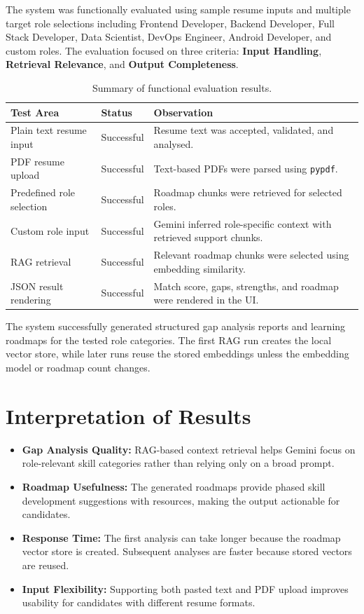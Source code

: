 \documentclass[12pt,a4paper]{report}
\begin{document}
The system was functionally evaluated using sample resume inputs and multiple
target role selections including Frontend Developer, Backend Developer, Full
Stack Developer, Data Scientist, DevOps Engineer, Android Developer, and custom
roles. The evaluation focused on three criteria: \textbf{Input Handling},
\textbf{Retrieval Relevance}, and \textbf{Output Completeness}.

\begin{table}[H]
\centering
\caption{Summary of functional evaluation results.}
\begin{tabular}{|p{4cm}|p{3cm}|p{6cm}|}
\hline
\textbf{Test Area} & \textbf{Status} & \textbf{Observation} \\
\hline
Plain text resume input & Successful & Resume text was accepted, validated, and analysed. \\
\hline
PDF resume upload & Successful & Text-based PDFs were parsed using \texttt{pypdf}. \\
\hline
Predefined role selection & Successful & Roadmap chunks were retrieved for selected roles. \\
\hline
Custom role input & Successful & Gemini inferred role-specific context with retrieved support chunks. \\
\hline
RAG retrieval & Successful & Relevant roadmap chunks were selected using embedding similarity. \\
\hline
JSON result rendering & Successful & Match score, gaps, strengths, and roadmap were rendered in the UI. \\
\hline
\end{tabular}
\end{table}

The system successfully generated structured gap analysis reports and learning
roadmaps for the tested role categories. The first RAG run creates the local
vector store, while later runs reuse the stored embeddings unless the embedding
model or roadmap count changes.

\section{Interpretation of Results}

\begin{itemize}
  \item \textbf{Gap Analysis Quality:} RAG-based context retrieval helps Gemini
        focus on role-relevant skill categories rather than relying only on a
        broad prompt.
  \item \textbf{Roadmap Usefulness:} The generated roadmaps provide phased skill
        development suggestions with resources, making the output actionable for
        candidates.
  \item \textbf{Response Time:} The first analysis can take longer because the
        roadmap vector store is created. Subsequent analyses are faster because
        stored vectors are reused.
  \item \textbf{Input Flexibility:} Supporting both pasted text and PDF upload
        improves usability for candidates with different resume formats.
\end{itemize}
\end{document}
